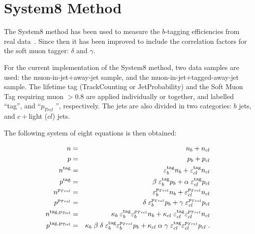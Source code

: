 \section{System8 Method}
\label{sec:system8}

The System8 method has been used to measure the $b$-tagging 
efficiencies from real data~\cite{ref:btag_oldnote}. Since then it has been 
improved to include the correlation factors for the soft muon tagger:
 $\delta $ and $\gamma$.
 
For the current implementation of the System8 method, 
two data samples are used: the muon-in-jet+away-jet sample, and the 
muon-in-jet+tagged-away-jet sample. The lifetime tag (TrackCounting or 
JetProbability) and the Soft Muon Tag requiring muon  \ptrel $ > 0.8 $\gevc 
are applied individually or together, and labelled ``tag'', and ``$p_{Trel}$ '',
 respectively. The jets are also divided in two categories: 
$b$ jets, and $c+$light ($cl$) jets. 

The following system of eight equations is then obtained:

\begin{eqnarray}
n &=& n_b + n_{cl} \nonumber\\
p &=& p_b+ p_{cl}\nonumber\\
n^{\rm{tag}} &=&
\varepsilon_b^{\rm{tag}} n_b + \varepsilon_{cl}^{\rm{tag}} n_{cl} \nonumber\\
p^{\rm{tag}} &=&
\beta \; \varepsilon_b^{\rm{tag}} p_b + \alpha \; \varepsilon_{cl}^{\rm{tag}} p_{cl} \nonumber\\
n^{p_{Trel}} &=&
\varepsilon_b^{p_{Trel}} n_b + \varepsilon_{cl}^{p_{Trel}} n_{cl} \nonumber \\
p^{p_{Trel}} &=& \delta \; \varepsilon_b^{p_{Trel}} p_b + \gamma \; \varepsilon_{cl}^{p_{Trel}} p_{cl} \nonumber\\
n^{\rm{tag},p_{Trel}} &=&
\kappa_b \; \varepsilon_b^{\rm{tag}} \varepsilon_b^{p_{Trel}} n_b +
\kappa_{cl} \; \varepsilon_{cl}^{\rm{tag}} \varepsilon_{cl}^{p_{Trel}} n_{cl} \nonumber\\
p^{\rm{tag},p_{Trel}} &=&
\kappa_b \; \beta \; \delta \; \varepsilon_b^{\rm{tag}} \varepsilon_b^{p_{Trel}} p_b +
\kappa_{cl} \; \alpha \; \gamma \; \varepsilon_{cl}^{\rm{tag}} \varepsilon_{cl}^{p_{Trel}} p_{cl} \;.\nonumber
\end{eqnarray}

